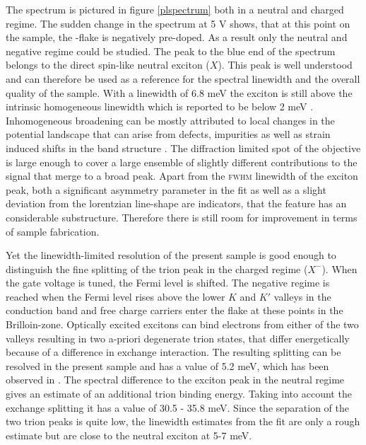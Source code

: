 The \pl spectrum is pictured in figure \ref{plspectrum} both in a neutral and charged regime. The sudden change in the spectrum at 5 V shows, that at this point on the sample, the \tmd-flake is negatively pre-doped. As a result only the neutral and negative regime could be studied. The peak to the blue end of the spectrum belongs to the direct spin-like neutral exciton ($X$). This peak is well understood and can therefore be used as a reference for the spectral linewidth and the overall quality of the sample. With a linewidth of 6.8 meV the exciton is still above the intrinsic homogeneous linewidth which is reported to be below 2 meV \cite{moody_intrinsic_2015, ajayi_approaching_2017}. Inhomogeneous broadening can be mostly attributed to local changes in the potential landscape that can arise from defects, impurities as well as strain induced shifts in the band structure \cite{zhu_strain_2013}. The diffraction limited spot of the objective is large enough to cover a large ensemble of slightly different contributions to the \pl signal that merge to a broad peak. Apart from the \textsc{fwhm} linewidth of the exciton peak, both a significant asymmetry parameter in the fit as well as a slight deviation from the lorentzian line-shape are indicators, that the feature has an considerable substructure. Therefore there is still room for improvement in terms of sample fabrication.

Yet the linewidth-limited resolution of the present sample is good enough to distinguish the fine splitting of the trion peak in the charged regime ($X^-$). When the gate voltage is tuned, the Fermi level is shifted. The negative regime is reached when the Fermi level rises above the lower $K$ and $K'$ valleys in the conduction band and free charge carriers enter the flake at these points in the Brilloin-zone. Optically excited excitons can bind electrons from either of the two valleys resulting in two a-priori degenerate trion states, that differ energetically because of a difference in exchange interaction. The resulting splitting can be resolved in the present sample and has a value of 5.2 meV, which has been observed in \cite{courtade_charged_2017}. The spectral difference to the exciton peak in the neutral regime gives an estimate of an additional trion binding energy. Taking into account the exchange splitting it has a value of 30.5 - 35.8 meV. Since the separation of the two trion peaks is quite low, the linewidth estimates from the fit are only a rough estimate but are close to the neutral exciton at 5-7 meV.

